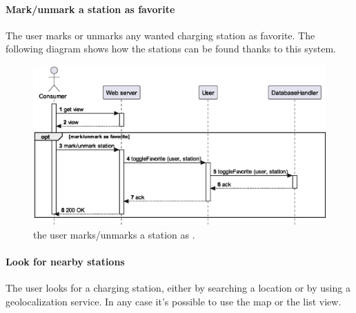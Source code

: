 \paragraph{Mark/unmark a station as favorite} The user marks or unmarks any wanted charging station as favorite. The following diagram shows how the stations can be found thanks to this system.

\begin{figure}[h!]
    \centering
    \includegraphics[width=0.9\columnwidth]{./images/sequences/emsp/favorite}
    \caption{the user marks/unmarks a station as .}
\end{figure}

\pagebreak

\paragraph{Look for nearby stations} The user looks for a charging station, either by searching a location or by using a geolocalization service. In any case it's possible to use the map or the list view.

